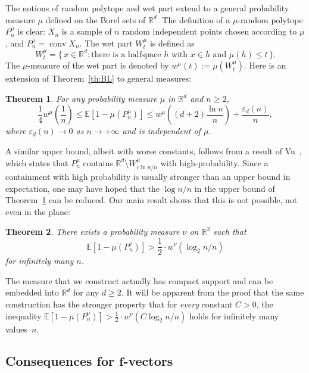 \documentclass[10pt]{amsart}
\newtheorem{theo}{Theorem}[section]
\theoremstyle{definition}\newtheorem{defi}[theo]{Definition}\newtheorem{rema}[theo]{Remark}\newtheorem{exam}[theo]{Example}\newtheorem{exem}[theo]{Example}\newtheorem{nota}[theo]{Notation}
\DeclareMathOperator{\conv}{conv}
\newcommand{\Rbb}{\mathbb{R}}%
\newcommand{\Ebb}{\mathbb{E}}%
\newcommand*{\mtfrac}[2]{\frac{#1}{#2}}%
\begin{document}
The notions of random polytope and wet part extend to a general probability measure $\mu$ defined on the Borel sets of $\Rbb^d$. The definition of a $\mu$-random polytope $P_n^{\mu}$ is clear: $X_n$ is a sample of $n$ random independent points chosen according to $\mu$, and $P_n^{\mu}=\conv X_n$. The wet part $W_t^{\mu}$ is defined as
\[
W_t^{\mu}=\{\,x \in \Rbb^d: \text{there is a halfspace }h \text{ with } x \in h \text{ and }\mu (h) \le t\,\}.
\]
The $\mu$-measure of the wet part is denoted by $w^{\mu}(t):=\mu(W_t^{\mu})$. Here is an extension of Theorem~\ref{th:BL} to general measures:

\begin{theo}\label{th:BLgen}
For any probability measure $\mu$ in $\Rbb^d$ and $n \ge 2$,
\[
\frac 14 w^{\mu}\left(\mtfrac1n\right) \le \Ebb[1-\mu(P_n^\mu)] \le w^{\mu}\left({(d+2)\mtfrac{\ln n}n}\right) + \mtfrac{\varepsilon_d(n)}{n},
\]
where $\varepsilon_d(n)\to 0$ as $n\to+\infty$ and is independent of $\mu$.
\end{theo}

A similar upper bound, albeit with worse constants, follows from a result of Vu~\cite[Lemma~4.2]{VanVu}, which states that $P_n^\mu$ contains $\Rbb^d \setminus W_{c\ln n/n}^{\mu}$ with high-probability. Since a containment with high probability is usually stronger than an upper bound in expectation, one may have hoped that the $\log n/n$ in the upper bound of Theorem~\ref{th:BLgen} can be reduced. Our main result shows that this is not possible, not even in the plane:


\begin{theo}\label{th:example}
There exists a probability measure $\nu$ on $\Rbb^2$ such that
\[
\Ebb[1-\mu(P_n^\nu)] > \frac 1{2} \cdot w^\nu(\log_2 n/ n)
\]
for infinitely many $n$.
\end{theo}



The measure that we construct actually has compact support and can be embedded into $\Rbb^d$ for any $d \ge 2$. It will be apparent from the proof that the same construction has the stronger property that for \emph{every} constant $C>0$, the inequality $\Ebb[1-\mu(P_n^\nu)] > \frac 1{2} \cdot w^\nu({C \log_2 n/ n})$ holds for infinitely many values~$n$.


\subsection{Consequences for \texorpdfstring{$\mathbf{f}$}{f}-vectors}\label{f-vectors}
\end{document}

